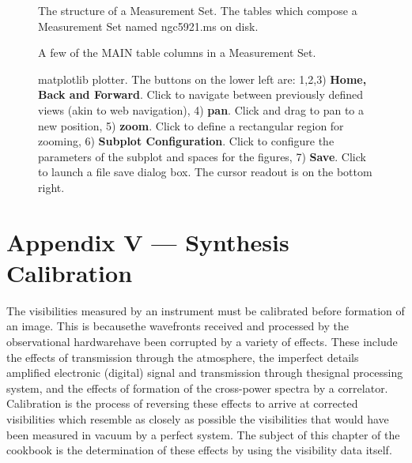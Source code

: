 \begin{figure}[h!]
\caption{\label{fig:tablekeyword} The structure of a Measurement
  Set. The tables which compose a Measurement Set named ngc5921.ms on
  disk.}
\hrulefill
\end{figure}
 
\begin{figure}[h!]
\caption{\label{fig:tablekeyword2} A few of the MAIN table columns in a
  Measurement Set.} 
\hrulefill
\end{figure}
 
\begin{figure}[h!]
\caption{\label{fig:matplotlib2} matplotlib plotter. The buttons on the
  lower left are: 1,2,3) {\bf Home, Back and Forward}. Click to navigate
  between previously defined views (akin to web navigation), 4)
  {\bf pan}. Click and drag to pan to a new position, 5) {\bf zoom}. Click to
  define a rectangular region for zooming, 6) {\bf Subplot
  Configuration}. Click to configure the parameters of the subplot and
  spaces for the figures, 7) {\bf Save}. Click to launch a file save
  dialog box. The cursor readout is on the bottom right.}
\hrulefill
\end{figure}

\chapter{Appendix V --- Synthesis Calibration}
\label{chapter:app.5}

\vspace{3mm}

The visibilities measured by an instrument must be calibrated before
formation of an image. This is becausethe wavefronts received and
processed by the observational hardwarehave been corrupted by a
variety of effects. These include the effects of transmission through
the atmosphere, the imperfect details amplified electronic (digital)
signal and transmission through thesignal processing system, and the
effects of formation of the cross-power spectra by a
correlator. Calibration is the process of reversing these effects to
arrive at corrected visibilities which resemble as closely as possible
the visibilities that would have been measured in vacuum by a perfect
system. The subject of this chapter of the cookbook is the
determination of these effects by using the visibility data itself. 


